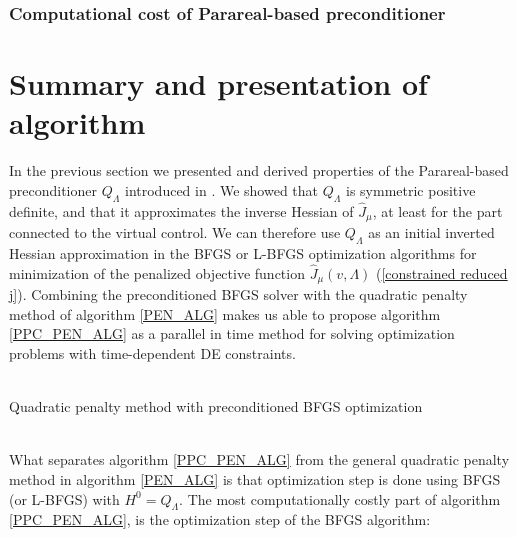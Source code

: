 \subsubsection{Computational cost of Parareal-based preconditioner}
\section{Summary and presentation of algorithm} \label{Algorithm_sec}
In the previous section we presented and derived properties of the Parareal-based preconditioner $Q_{\Lambda}$ introduced in \cite{maday2002parareal}. We showed that $Q_{\Lambda}$ is symmetric positive definite, and that it approximates the inverse Hessian of $\hat J_{\mu}$, at least for the part connected to the virtual control. We can therefore use $Q_{\Lambda}$ as an initial inverted Hessian approximation in the BFGS or L-BFGS optimization algorithms for minimization of the penalized objective function $\hat J_{\mu}(v,\Lambda)$ (\ref{constrained reduced j}). Combining the preconditioned BFGS solver with the quadratic penalty method of algorithm \ref{PEN_ALG} makes us able to propose algorithm \ref{PPC_PEN_ALG} as a parallel in time method for solving optimization problems with time-dependent DE constraints.
\\
\\
\begin{algorithm}[H] 
\caption{Quadratic penalty method with preconditioned BFGS optimization\label{PPC_PEN_ALG}}
\end{algorithm}
\noindent
\\
What separates algorithm \ref{PPC_PEN_ALG} from the general quadratic penalty method in algorithm \ref{PEN_ALG} is that optimization step is done using BFGS (or L-BFGS) with $H^0=Q_{\Lambda}$. The most computationally costly part of algorithm \ref{PPC_PEN_ALG}, is the optimization step of the BFGS algorithm:
